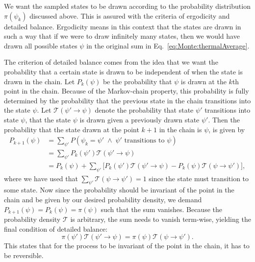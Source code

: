 We want the sampled states to be drawn according to the probability distribution $\pi(\psi_k)$ discussed above. This is assured
with the criteria of ergodicity and detailed balance. Ergodicity means in this context that the states are drawn in such a way
that if we were to draw infinitely many states, then we would have drawn all possible states $\psi$ in the original sum in
Eq.~\eqref{eq:Monte:thermalAverage}.

The criterion of detailed balance comes from the idea that we want the probability that
a certain state is drawn to be independent of when the state is drawn in the chain. Let $P_k(\psi)$ be the probability
that $\psi$ is drawn at the $k$th point in the chain. Because of the Markov-chain property, this probability is fully determined
by the probability that the previous state in the chain transitions into the state $\psi$. Let $\mathcal{T}(\psi'\to\psi)$ denote
the probability that state $\psi'$ transitions into state $\psi$, \ie that the state $\psi$ is drawn given a previously drawn
state $\psi'$. Then the probability that the state drawn at the point $k+1$ in the chain is $\psi$, is given by
\begin{equation}
    \label{eq:Monte:pointProbability}
    \begin{split}
        P_{k+1}(\psi) &= \sum_{\psi'}P(\psi_k = \psi'\;\land\;\psi'\text{ transitions to }\psi)\\
        &= \sum_{\psi'}P_k(\psi')\mathcal{T}(\psi'\to\psi)\\
        &= P_k(\psi) + \sum_{\psi'}\Big[P_k(\psi')\mathcal{T}(\psi'\to\psi) - P_k(\psi)\mathcal{T}(\psi\to\psi')\Big],
    \end{split}
\end{equation}
where we have used that $\sum_{\psi'}\mathcal{T}(\psi\to\psi') = 1$ since the state must transition to some state. Now since
the probability should be invariant of the point in the chain and be given by our desired probability density,
we demand $P_{k+1}(\psi) = P_k(\psi) = \pi(\psi)$ such that the sum vanishes.
Because the probability density $\mathcal{T}$ is arbitrary, the sum needs to vanish term-wise, yielding the final condition
of detailed balance:
\begin{equation}
    \label{eq:Monte:detailedBalance}
    \pi(\psi')\mathcal{T}(\psi'\to\psi) = \pi(\psi)\mathcal{T}(\psi\to\psi').
\end{equation}
This states that for the process to be invariant of the point in the chain, it has to be reversible.

